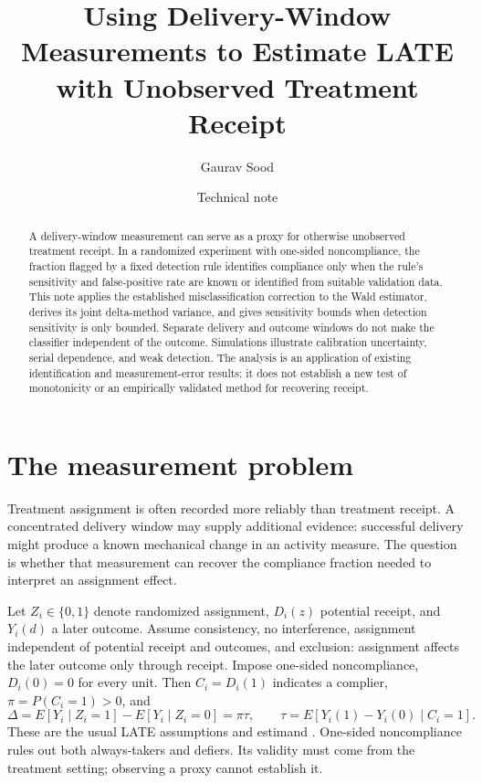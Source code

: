 \documentclass[11pt]{article}
\title{Using Delivery-Window Measurements to Estimate LATE\\with Unobserved Treatment Receipt}
\author{Gaurav Sood}
\date{Technical note}
\begin{document}
\maketitle

\begin{abstract}
A delivery-window measurement can serve as a proxy for otherwise unobserved treatment receipt. In a randomized experiment with one-sided noncompliance, the fraction flagged by a fixed detection rule identifies compliance only when the rule's sensitivity and false-positive rate are known or identified from suitable validation data. This note applies the established misclassification correction to the Wald estimator, derives its joint delta-method variance, and gives sensitivity bounds when detection sensitivity is only bounded. Separate delivery and outcome windows do not make the classifier independent of the outcome. Simulations illustrate calibration uncertainty, serial dependence, and weak detection. The analysis is an application of existing identification and measurement-error results; it does not establish a new test of monotonicity or an empirically validated method for recovering receipt.
\end{abstract}

\section{The measurement problem}

Treatment assignment is often recorded more reliably than treatment receipt. A concentrated delivery window may supply additional evidence: successful delivery might produce a known mechanical change in an activity measure. The question is whether that measurement can recover the compliance fraction needed to interpret an assignment effect.

Let $Z_i\in\{0,1\}$ denote randomized assignment, $D_i(z)$ potential receipt, and $Y_i(d)$ a later outcome. Assume consistency, no interference, assignment independent of potential receipt and outcomes, and exclusion: assignment affects the later outcome only through receipt. Impose one-sided noncompliance, $D_i(0)=0$ for every unit. Then $C_i=D_i(1)$ indicates a complier, $\pi=P(C_i=1)>0$, and
\begin{equation}\label{eq:wald}
\Delta=E[Y_i\mid Z_i=1]-E[Y_i\mid Z_i=0]=\pi\tau,
\qquad \tau=E[Y_i(1)-Y_i(0)\mid C_i=1].
\end{equation}
These are the usual LATE assumptions and estimand \citep{imbens1994,angrist1996}. One-sided noncompliance rules out both always-takers and defiers. Its validity must come from the treatment setting; observing a proxy cannot establish it.
\end{document}
